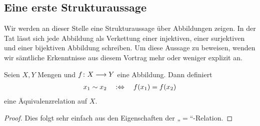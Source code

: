 
\subsection{Eine erste Strukturaussage}


Wir werden an dieser Stelle eine Strukturaussage über Abbildungen
zeigen. In der Tat lässt sich jede Abbildung als Verkettung einer
injektiven, einer surjektiven und einer bijektiven Abbildung schreiben. Um
diese Aussage zu beweisen, wenden wir sämtliche Erkenntnisse aus diesem
Vortrag mehr oder weniger explizit an.


\begin{bem}
\label{bem:niveau}

  Seien $X,Y$ Mengen und $f\colon X \longrightarrow Y$ eine Abbildung. Dann definiert
  \begin{align*}
    x_{1} \sim x_{2} \quad :\Leftrightarrow \quad f(x_{1}) = f(x_{2})
  \end{align*}
  eine Äquivalenzrelation auf $X$.
  \begin{proof}
    Dies folgt sehr einfach aus den Eigenschaften der „$=$“-Relation.
  \end{proof}
\end{bem}


